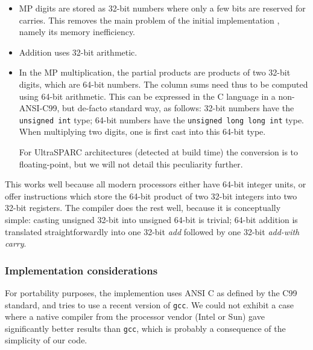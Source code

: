 \begin{itemize}
\item MP digits are stored as 32-bit numbers where only a few bits are
  reserved for carries. This removes the main problem of the initial
implementation \cite{Dinechin2002b}, namely its memory inefficiency.

\item Addition uses 32-bit arithmetic. 

\item In the MP multiplication, the partial products are products of
  two 32-bit digits, which are 64-bit numbers. The column sums need
  thus to be computed using 64-bit arithmetic. This can be expressed
  in the C language in a non-ANSI-C99, but de-facto standard way, as
  follows: 32-bit numbers have the \texttt{unsigned int} type; 64-bit
  numbers have the \texttt{unsigned long long int} type. When
  multiplying two digits, one is first cast into this 64-bit type.
  
  For UltraSPARC architectures (detected at build time) the
  conversion is to floating-point, but we will not detail this
  peculiarity further.
\end{itemize}


This works well because all modern processors either have 64-bit
integer units, or offer instructions which store the 64-bit product of
two 32-bit integers into two 32-bit registers. The compiler does the
rest well, because it is conceptually simple: casting unsigned 32-bit
into unsigned 64-bit is trivial; 64-bit addition is translated
straightforwardly into one 32-bit \emph{add} followed by one 32-bit
\emph{add-with carry}.




\subsubsection{Implementation considerations}

For portability purposes, the implemention uses ANSI C as defined by
the C99 standard, and tries to use a recent version of \texttt{gcc}.
We could not exhibit a case where a native compiler from the processor
vendor (Intel or Sun) gave significantly better results than
\texttt{gcc}, which is probably a consequence of the simplicity of our
code.

